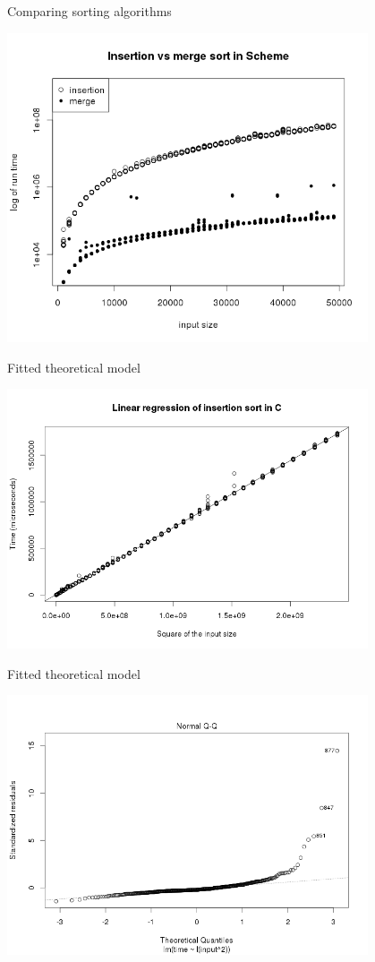 \documentclass[]{beamer}
\begin{document}
\begin{frame}[t]{Comparing sorting algorithms}
\begin{center}
	\includegraphics[width=0.8\textwidth]{plots/insertion_vs_merge_in_scheme.png}
\end{center}
\end{frame}

\begin{frame}[t]{Fitted theoretical model}
\begin{center}
	\includegraphics[width=0.8\textwidth]{plots/regression-fit.png}
\end{center}
\end{frame}

\begin{frame}[t]{Fitted theoretical model}
\begin{center}
	\includegraphics[width=0.8\textwidth]{plots/qq-plot.png}
\end{center}
\end{frame}
\end{document}

